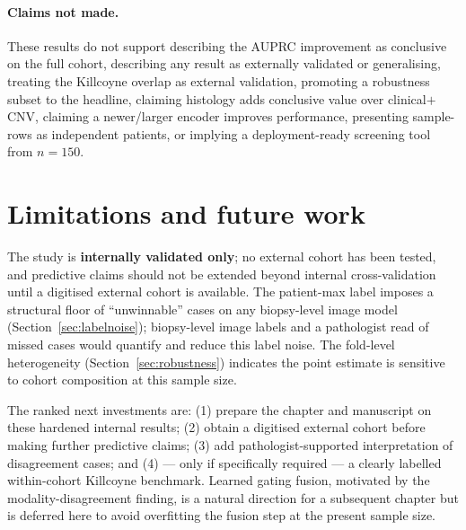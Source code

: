 \paragraph{Claims not made.} These results do not support describing the AUPRC
improvement as conclusive on the full cohort, describing any result as
externally validated or generalising, treating the Killcoyne overlap as external
validation, promoting a robustness subset to the headline, claiming histology
adds conclusive value over clinical$+$CNV, claiming a newer/larger encoder
improves performance, presenting sample-rows as independent patients, or
implying a deployment-ready screening tool from $n=150$.

\section{Limitations and future work}
\label{sec:limitations}

The study is \textbf{internally validated only}; no external cohort has been
tested, and predictive claims should not be extended beyond internal
cross-validation until a digitised external cohort is available. The patient-max
label imposes a structural floor of ``unwinnable'' cases on any biopsy-level
image model (Section~\ref{sec:labelnoise}); biopsy-level image labels and a
pathologist read of missed cases would quantify and reduce this label noise. The
fold-level heterogeneity (Section~\ref{sec:robustness}) indicates the point
estimate is sensitive to cohort composition at this sample size.

The ranked next investments are: (1) prepare the chapter and manuscript on these
hardened internal results; (2) obtain a digitised external cohort before making
further predictive claims; (3) add pathologist-supported interpretation of
disagreement cases; and (4) --- only if specifically required --- a clearly
labelled within-cohort Killcoyne benchmark. Learned gating fusion, motivated by
the modality-disagreement finding, is a natural direction for a subsequent
chapter but is deferred here to avoid overfitting the fusion step at the present
sample size.
